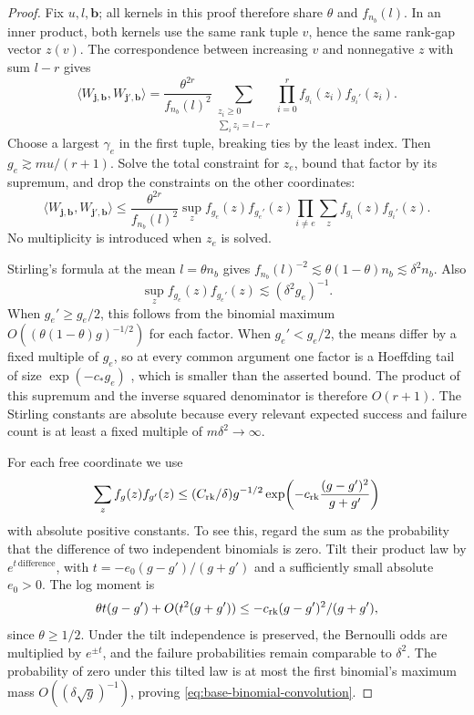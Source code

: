 \begin{proof}
Fix \(u,l,\mathbf b\); all kernels in this proof therefore share \(\theta\) and \(f_{n_b}(l)\). In an inner product, both kernels use the same rank tuple \(v\), hence the same rank-gap vector \(z(v)\). The correspondence between increasing \(v\) and nonnegative \(z\) with sum \(l-r\) gives
\[
 \langle W_{\mathbf j,\mathbf b},W_{\mathbf j',\mathbf b}\rangle
 =\frac{\theta^{2r}}{f_{n_b}(l)^2}
   \sum_{\substack{z_i\ge0\\\sum_i z_i=l-r}}
       \prod_{i=0}^{r}f_{g_i}(z_i)f_{g_i'}(z_i).
\]
Choose a largest \(\gamma_e\) in the first tuple, breaking ties by the least index. Then \(g_e\gtrsim mu/(r+1)\). Solve the total constraint for \(z_e\), bound that factor by its supremum, and drop the constraints on the other coordinates:
\begin{equation}\label{eq:base-inner-product}
 \langle W_{\mathbf j,\mathbf b},W_{\mathbf j',\mathbf b}\rangle
 \le\frac{\theta^{2r}}{f_{n_b}(l)^2}
      \sup_z f_{g_e}(z)f_{g_e'}(z)
      \prod_{i\ne e}\sum_z f_{g_i}(z)f_{g_i'}(z).
\end{equation}
No multiplicity is introduced when \(z_e\) is solved.

Stirling's formula at the mean \(l=\theta n_b\) gives
\(f_{n_b}(l)^{-2}\lesssim\theta(1-\theta)n_b\lesssim\delta^2n_b\).
Also
\[
 \sup_z f_{g_e}(z)f_{g_e'}(z)\lesssim(\delta^2g_e)^{-1}.
\]
When \(g_e'\ge g_e/2\), this follows from the binomial maximum
\(O((\theta(1-\theta)g)^{-1/2})\) for each factor. When
\(g_e'<g_e/2\), the means differ by a fixed multiple of \(g_e\), so at every common argument one factor is a Hoeffding tail of size
\(\exp(-c_* g_e)\) \cite[Theorem~2]{Hoeffding1963}, which is smaller than the asserted bound. The product of this supremum and the inverse squared denominator is therefore \(O(r+1)\). The Stirling constants are absolute because every relevant expected success and failure count is at least a fixed multiple of \(m\delta^2\to\infty\).

For each free coordinate we use
\begin{equation}\label{eq:base-binomial-convolution}
 \sum_z f_g(z)f_{g'}(z)
 \le (C_{\rm rk}/\delta)g^{-1/2}
       \exp\!\left(-c_{\rm rk}\frac{(g-g')^2}{g+g'}\right)
\end{equation}
with absolute positive constants. To see this, regard the sum as the probability that the difference of two independent binomials is zero. Tilt their product law by \(e^{t\,\mathrm{difference}}\), with
\(t=-e_0(g-g')/(g+g')\) and a sufficiently small absolute \(e_0>0\).
The log moment is
\[
 \theta t(g-g')+O(t^2(g+g'))
 \le-c_{\rm rk}(g-g')^2/(g+g'),
\]
since \(\theta\ge1/2\). Under the tilt independence is preserved, the Bernoulli odds are multiplied by \(e^{\pm t}\), and the failure probabilities remain comparable to \(\delta^2\). The probability of zero under this tilted law is at most the first binomial's maximum mass \(O((\delta\sqrt g)^{-1})\), proving \eqref{eq:base-binomial-convolution}.


\end{proof}

